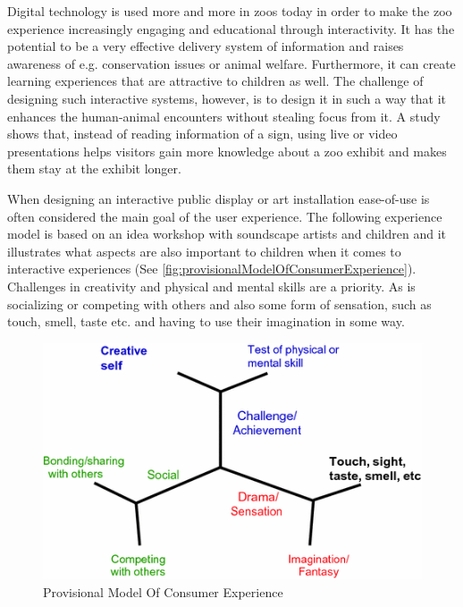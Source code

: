 Digital technology is used more and more in zoos today in order to make the zoo experience increasingly engaging and educational through interactivity\cite{webberInteractiveTechInZoo}. It has the potential to be a very effective delivery system of information and raises awareness of e.g. conservation issues or animal welfare. Furthermore, it can create learning experiences that are attractive to children as well\cite{webberInteractiveTechInZoo}. The challenge of designing such interactive systems, however, is to design it in such a way that it enhances the human-animal encounters without stealing focus from it\cite{webberInteractiveTechInZoo}. A study shows that, instead of reading information of a sign, using live or video presentations helps visitors gain more knowledge about a zoo exhibit and makes them stay at the exhibit longer\cite{presentationStayDuration}.

When designing an interactive public display or art installation ease-of-use is often considered the main goal of the user experience\cite{Hull2018}. The following experience model is based on an idea workshop with soundscape artists and children and it illustrates what aspects are also important to children when it comes to interactive experiences (See \autoref{fig:provisionalModelOfConsumerExperience}). Challenges in creativity and physical and mental skills are a priority. As is socializing or competing with others and also some form of sensation, such as touch, smell, taste etc. and having to use their imagination in some way.
\begin{figure}[H]
    	\centering
    	\includegraphics[width=0.9\linewidth]{figure/Analysis/provModelExp.png}
    	\caption{Provisional Model Of Consumer Experience\cite{Hull2018}}
    	\label{fig:provisionalModelOfConsumerExperience}
\end{figure}

